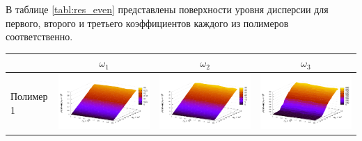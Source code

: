 \documentclass[11pt,a4paper]{article}
\theoremstyle{definition}
\begin{document}
В таблице \ref{tabl:res_even} представлены
поверхности уровня дисперсии для первого, второго и третьего коэффициентов каждого из полимеров
соответственно.

\begin{table}[h]
  \centering
  \footnotesize
  \begin{tabular}{l | c c c}
	  & $\omega_1$ & $\omega_2$ & $\omega_3$ \\ \hline
	\begin{rotate}{90}Полимер 1\end{rotate} &	\includegraphics[scale=0.4]{figs/even/p1.txt_coeff0.dat.pdf} & \includegraphics[scale=0.4]{figs/even/p1.txt_coeff1.dat.pdf} & \includegraphics[scale=0.4]{figs/even/p1.txt_coeff2.dat.pdf} \\

\end{tabular}
\end{table}
\end{document}
